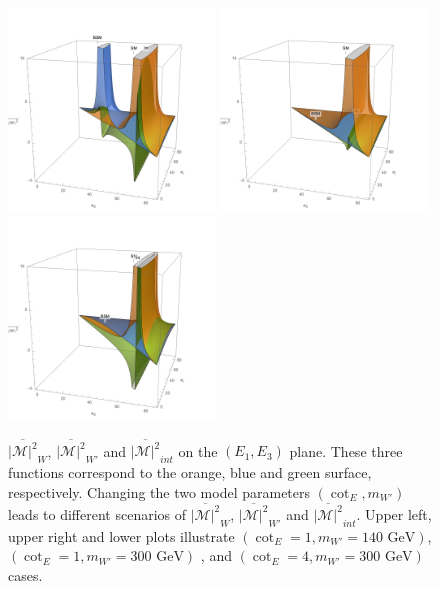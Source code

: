 \begin{figure}[ht]
    \centering
    \includegraphics[width=0.49\textwidth]{chapters/RelatedWorks/sectionBSM/figures/WPrime_140_1.png}
    \includegraphics[width=0.49\textwidth]{chapters/RelatedWorks/sectionBSM/figures/WPrime_300_1.png}
    \includegraphics[width=0.49\textwidth]{chapters/RelatedWorks/sectionBSM/figures/WPrime_300_4.png}
    \caption{ $\overline{ |\mathcal{M}|^2 } _{W}$, $\overline{ |\mathcal{M}|^2 } _{W'} $ and $\overline{ |\mathcal{M}|^2 } _{int}$ on the $(E_1,E_3)$ plane. These three functions correspond to the orange, blue and green surface, respectively. Changing the two model parameters $(\cot_E, m_{W'})$ leads to different scenarios of $\overline{ |\mathcal{M}|^2 } _{W}$, $\overline{ |\mathcal{M}|^2 } _{W'} $ and $\overline{ |\mathcal{M}|^2 } _{int}$. Upper left, upper right and lower plots illustrate  $(\cot_E=1, m_{W'}=140  \text{ GeV} )$, $(\cot_E=1, m_{W'}=300  \text{ GeV} )$ , and $(\cot_E=4, m_{W'}=300  \text{ GeV} )$ cases. }
    \label{fig:relatedWorks:bsm:WPrime:m2}
\end{figure}



